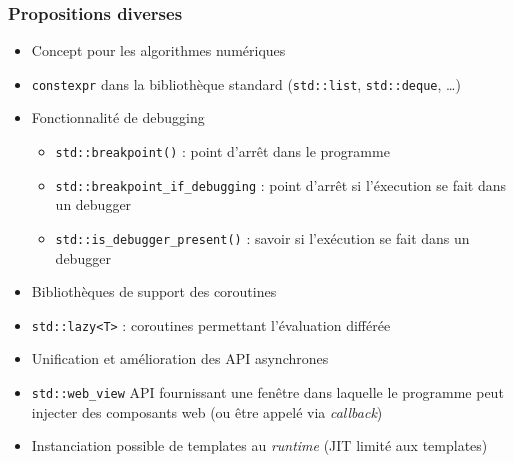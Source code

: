 \documentclass[C++.tex]{subfiles}
\begin{document}
\begin{frame}[fragile]
	\frametitle{Propositions diverses}
	\begin{itemize}
		\item Concept pour les algorithmes numériques
		\item \lstinline|constexpr| dans la bibliothèque standard (\lstinline|std::list|, \lstinline|std::deque|, \ldots)


		\item Fonctionnalité de debugging
		\begin{itemize}
			\item \lstinline|std::breakpoint()| : point d'arrêt dans le programme
			\item \lstinline|std::breakpoint_if_debugging| : point d'arrêt si l'éxecution se fait dans un debugger
			\item \lstinline|std::is_debugger_present()| : savoir si l'exécution se fait dans un debugger
		\end{itemize}
		\item Bibliothèques de support des coroutines
		\item \lstinline|std::lazy<T>| : coroutines permettant l'évaluation différée
		\item Unification et amélioration des API asynchrones


		\item \lstinline|std::web_view| API fournissant une fenêtre dans laquelle le programme peut injecter des composants web (ou être appelé via \textit{callback})
		\item Instanciation possible de templates au \textit{runtime} (JIT limité aux templates)

	\end{itemize}
\end{frame}
\end{document}
